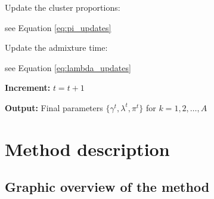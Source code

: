 \begin{algorithm}
\begin{algorithmic}[1]
        \State Update the cluster proportions:
        
        \hspace{7mm} see Equation \ref{eq:pi_updates}
        
        \State Update the admixture time:
        
        \hspace{7mm} see Equation \ref{eq:lambda_updates}
            
    \EndFor
    

    \State \textbf{Increment:} $t = t + 1$
    

\State \textbf{Output:} Final parameters $\{\gamma^{t}, \lambda^{t}, \pi^{t}\}$ for $k = 1, 2, \dots, A$

\end{algorithmic}
\end{algorithm}

\section{Method description}
\label{sec:ch2-gb-method}
\subsection{Graphic overview of the method}


